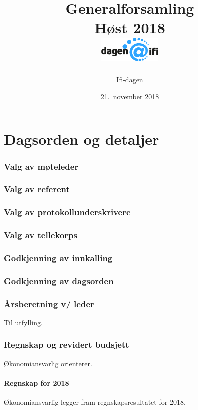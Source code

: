\documentclass[10pt,norsk,a4paper]{article}
\title{Generalforsamling \\
	Høst 2018\\[3cm]
	\includegraphics[width=3cm,trim=0 4cm 0 0]{../../res/logo.png}\\}
\date{21.\ november 2018}
\author{Ifi-dagen}
\begin{document}
\maketitle{}
\newpage
\part{Dagsorden og detaljer}
\tableofcontents{}
\newpage


\section{Valg av møteleder}

\section{Valg av referent}

\section{Valg av protokollunderskrivere}

\section{Valg av tellekorps}

\section{Godkjenning av innkalling}

\section{Godkjenning av dagsorden}

\section{Årsberetning v/ leder}
Til utfylling.

\section{Regnskap og revidert budsjett}
Økonomiansvarlig orienterer.

\subsection{Regnskap for 2018}
Økonomiansvarlig legger fram regnskapsresultatet for 2018.
\end{document}
